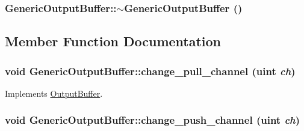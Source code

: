 \hypertarget{classGenericOutputBuffer_d67316556a00a71d7b98818de74328ff}{
\subsubsection[{$\sim$GenericOutputBuffer}]{\setlength{\rightskip}{0pt plus 5cm}GenericOutputBuffer::$\sim$GenericOutputBuffer ()}}
\label{classGenericOutputBuffer_d67316556a00a71d7b98818de74328ff}




\subsection{Member Function Documentation}
\hypertarget{classGenericOutputBuffer_c4f3cf09d07b340af349820bcaed731e}{
\subsubsection[{change\_\-pull\_\-channel}]{\setlength{\rightskip}{0pt plus 5cm}void GenericOutputBuffer::change\_\-pull\_\-channel ({\bf uint} {\em ch})}}
\label{classGenericOutputBuffer_c4f3cf09d07b340af349820bcaed731e}




Implements \hyperlink{classOutputBuffer_fb8e0a16f34dcff4c0d954201712f762}{OutputBuffer}.\hypertarget{classGenericOutputBuffer_d7576df13afbc101eb997e35ad417739}{
\subsubsection[{change\_\-push\_\-channel}]{\setlength{\rightskip}{0pt plus 5cm}void GenericOutputBuffer::change\_\-push\_\-channel ({\bf uint} {\em ch})}}
\label{classGenericOutputBuffer_d7576df13afbc101eb997e35ad417739}




